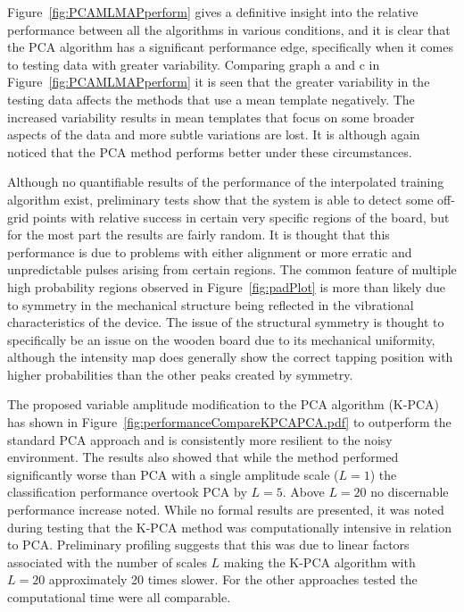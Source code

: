 Figure~\ref{fig:PCAMLMAPperform} gives a definitive insight into the relative performance between all the algorithms in various conditions, and it is clear that the PCA algorithm has a significant performance edge, specifically when it comes to testing data with greater variability. Comparing graph a and c in Figure~\ref{fig:PCAMLMAPperform} it is seen that the greater variability in the testing data affects the methods that use a mean template negatively. The increased variability results in mean templates that focus on some broader aspects of the data and more subtle variations are lost. It is although again noticed that the PCA method performs better under these circumstances.

Although no quantifiable results of the performance of the interpolated training algorithm exist, preliminary tests show that the system is able to detect some off- grid points with relative success in certain very specific regions of the board, but for the most part the results are fairly random. It is thought that this performance is due to problems with either alignment or more erratic and unpredictable pulses arising from certain regions. The common feature of multiple high probability regions observed in Figure~\ref{fig:padPlot} is more than likely due to symmetry in the mechanical structure being reflected in the vibrational characteristics of the device. The issue of the structural symmetry is thought to specifically be an issue on the wooden board due to its mechanical uniformity, although the intensity map does generally show the correct tapping position with higher probabilities than the other peaks created by symmetry.

The proposed variable amplitude modification to the PCA algorithm (K-PCA) has shown in Figure~\ref{fig:performanceCompareKPCAPCA.pdf} to outperform the standard PCA approach and is consistently more resilient to the noisy environment. The results also showed that while the method performed significantly worse than PCA with a single amplitude scale ($L=1$) the classification performance overtook PCA by $L=5$. Above $L=20$ no discernable performance increase noted. While no formal results are presented, it was noted during testing that the K-PCA method was computationally intensive in relation to PCA. Preliminary profiling suggests that this was due to linear factors associated with the number of scales $L$ making the K-PCA algorithm with $L=20$ approximately 20 times slower. For the other approaches tested the computational time were all comparable.

